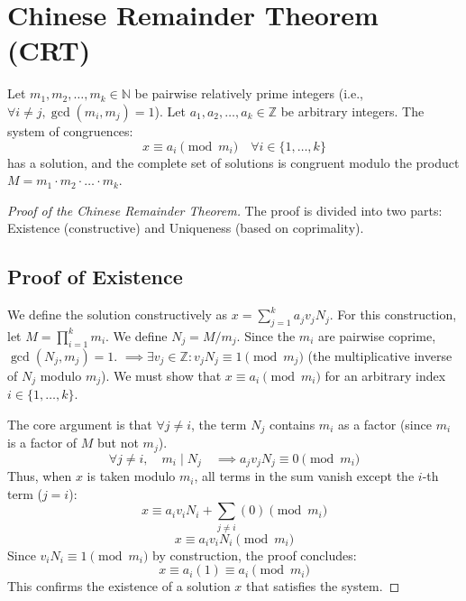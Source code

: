\section{Chinese Remainder Theorem (CRT)}

\begin{theorem}
Let $m_1, m_2, \dots, m_k \in \mathbb{N}$ be pairwise relatively prime integers (i.e., $\forall i \neq j, \gcd(m_i, m_j) = 1$). Let $a_1, a_2, \dots, a_k \in \mathbb{Z}$ be arbitrary integers.
The system of congruences:
$$ x \equiv a_i \pmod{m_i} \quad \forall i \in \{1, \dots, k\} $$
has a solution, and the complete set of solutions is congruent modulo the product $M = m_1 \cdot m_2 \cdot \dots \cdot m_k$.
\end{theorem}

\begin{proof}[Proof of the Chinese Remainder Theorem]
The proof is divided into two parts: Existence (constructive) and Uniqueness (based on coprimality).

\subsection*{Proof of Existence}
We define the solution constructively as $x = \sum_{j=1}^{k} a_j v_j N_j$.
For this construction, let $M = \prod_{i=1}^{k} m_i$. We define $N_j = M/m_j$.
Since the $m_i$ are pairwise coprime, $\gcd(N_j, m_j) = 1$. $\implies \exists v_j \in \mathbb{Z} : v_j N_j \equiv 1 \pmod{m_j}$ (the multiplicative inverse of $N_j$ modulo $m_j$).
We must show that $x \equiv a_i \pmod{m_i}$ for an arbitrary index $i \in \{1, \dots, k\}$.
\par
The core argument is that $\forall j \neq i$, the term $N_j$ contains $m_i$ as a factor (since $m_i$ is a factor of $M$ but not $m_j$).
$$ \forall j \neq i, \quad m_i \mid N_j \quad \implies a_j v_j N_j \equiv 0 \pmod{m_i} $$
Thus, when $x$ is taken modulo $m_i$, all terms in the sum vanish except the $i$-th term ($j=i$):
$$ x \equiv a_i v_i N_i + \sum_{j \neq i} (0) \pmod{m_i} $$
$$ x \equiv a_i v_i N_i \pmod{m_i} $$
Since $v_i N_i \equiv 1 \pmod{m_i}$ by construction, the proof concludes:
$$ x \equiv a_i(1) \equiv a_i \pmod{m_i} $$
This confirms the existence of a solution $x$ that satisfies the system.


\end{proof}
